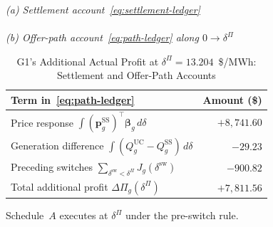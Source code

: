 \documentclass[journal]{IEEEtran}
\newcommand{\bp}{\bm p}
\newcommand{\UC}{\mathrm{UC}}
\newcommand{\SSched}{\mathrm{SS}}
\begin{document}
\begin{table}[t]
\centering
\caption{G1's Additional Actual Profit at $\delta^{\Pi}=13.204$~\$/MWh: Settlement and Offer-Path Accounts}
\label{tab:settlement}
\footnotesize
\textit{(a) Settlement account~\eqref{eq:settlement-ledger}}\\[2pt]
\\[2pt]
\textit{(b) Offer-path account~\eqref{eq:path-ledger} along $0\to\delta^{\Pi}$}\\[2pt]
\begin{tabular}{@{}lr@{}}\toprule
Term in~\eqref{eq:path-ledger} & Amount (\$)\\\midrule
Price response $\int (\bp_g^{\SSched})^\top\bm{\beta}_g\,d\delta$ & $+8{,}741.60$\\
Generation difference $\int (Q_g^{\UC}-Q_g^{\SSched})\,d\delta$ & $-29.23$\\
Preceding switches $\sum_{\delta^{\mathrm{sw}}<\delta^{\Pi}} J_g(\delta^{\mathrm{sw}})$ & $-900.82$\\\midrule
Total additional profit $\Delta\Pi_g(\delta^{\Pi})$ & $+7{,}811.56$\\\bottomrule
\end{tabular}
\vspace{2pt}\parbox{\columnwidth}{\footnotesize Schedule~$A$ executes at $\delta^{\Pi}$ under the pre-switch rule.}
\end{table}

\end{document}
